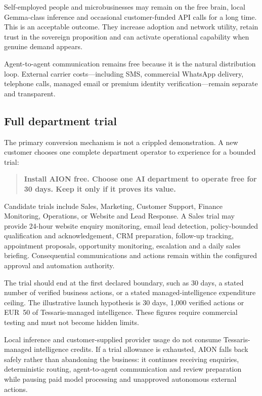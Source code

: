 Self-employed people and microbusinesses may remain on the free brain, local Gemma-class inference
and occasional customer-funded API calls for a long time. This is an acceptable outcome. They
increase adoption and network utility, retain trust in the sovereign proposition and can activate
operational capability when genuine demand appears.

Agent-to-agent communication remains free because it is the natural distribution loop. External
carrier costs---including SMS, commercial WhatsApp delivery, telephone calls, managed email or
premium identity verification---remain separate and transparent.

\subsection{Full department trial}

The primary conversion mechanism is not a crippled demonstration. A new customer chooses one
complete department operator to experience for a bounded trial:

\begin{quote}
\textbf{Install AION free. Choose one AI department to operate free for 30 days. Keep it only if
it proves its value.}
\end{quote}

Candidate trials include Sales, Marketing, Customer Support, Finance Monitoring, Operations, or
Website and Lead Response. A Sales trial may provide 24-hour website enquiry monitoring, email
lead detection, policy-bounded qualification and acknowledgement, CRM preparation, follow-up
tracking, appointment proposals, opportunity monitoring, escalation and a daily sales briefing.
Consequential communications and actions remain within the configured approval and automation
authority.

The trial should end at the first declared boundary, such as 30 days, a stated number of verified
business actions, or a stated managed-intelligence expenditure ceiling. The illustrative launch
hypothesis is 30 days, 1,000 verified actions or EUR~50 of Tessaris-managed intelligence. These
figures require commercial testing and must not become hidden limits.

Local inference and customer-supplied provider usage do not consume Tessaris-managed intelligence
credits. If a trial allowance is exhausted, AION falls back safely rather than abandoning the
business: it continues receiving enquiries, deterministic routing, agent-to-agent communication
and review preparation while pausing paid model processing and unapproved autonomous external
actions.

